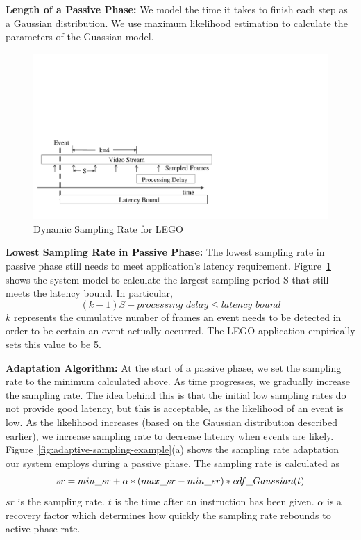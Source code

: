 \textbf{Length of a Passive Phase: }
We model the time it takes to finish each step as a Gaussian distribution. We
use maximum likelihood estimation to calculate the parameters of the Guassian
model.

\begin{figure}[]
\centering
\includegraphics[width=0.95\linewidth,trim=2em 3em 28em 20em, clip]{FIGS/fig-lego-sampling-model.pdf}
\caption{\small Dynamic Sampling Rate for LEGO}
\label{fig:lego-sampling-model}
\end{figure}

\textbf{Lowest Sampling Rate in Passive Phase: }
The lowest sampling rate in passive phase still needs to meet application's
latency requirement. Figure~\ref{fig:lego-sampling-model} shows the system model
to calculate the largest sampling period S that still meets the latency bound.
In particular,
$$(k-1)S + processing\_delay \leq latency\_bound $$ $k$ represents the
cumulative number of frames an event needs to be detected in order to be
certain an event actually occurred. The LEGO application empirically sets this
value to be 5. 

\textbf{Adaptation Algorithm: }
At the start of a passive phase, we set the sampling rate to the
minimum calculated above.  As time progresses, we gradually increase
the sampling rate.  The idea behind this is that the initial low
sampling rates do not provide good latency, but this is acceptable, as
the likelihood of an event is low.  As the likelihood increases (based
on the Gaussian distribution described earlier), we increase sampling
rate to decrease latency when events are likely.
Figure~\ref{fig:adaptive-sampling-example}(a) shows the sampling rate
adaptation our system employs during a passive phase.
The sampling rate is calculated as $$sr = \\
%
 min\_sr + \alpha * (max\_sr - min\_sr) * cdf\_Gaussian(t)$$ 
%
$sr$ is the sampling rate. $t$ is the time after an instruction has been given. $\alpha$ is
a recovery factor which determines how quickly the sampling rate
rebounds to active phase rate. 
 
